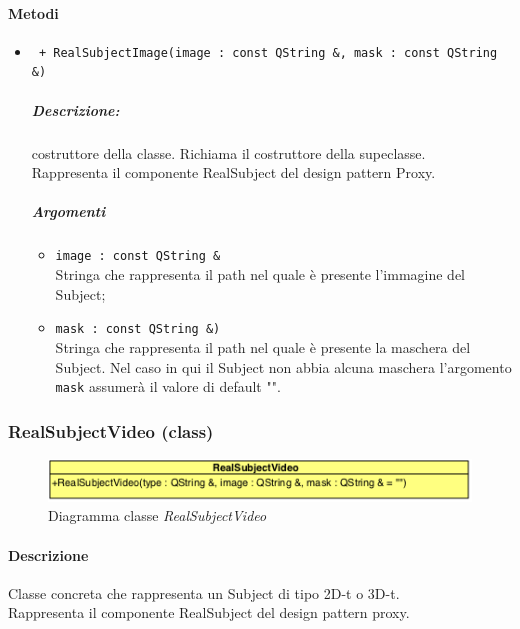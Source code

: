 \paragraph{Metodi \\}
	\begin{itemize}
		\item \color{blue}\verb! + RealSubjectImage(image : const QString &, mask : const QString &)!
		\color{black}
		\subparagraph{Descrizione:} costruttore della classe. Richiama il costruttore della supeclasse.
		\\Rappresenta il componente RealSubject del design pattern\g{} Proxy.
		
		\subparagraph{Argomenti}
			\begin{itemize}
				\item \color{RoyalPurple}\verb!image : const QString &!\\
				\color{black}Stringa che rappresenta il path nel quale è presente l'immagine del Subject\g{};
				
				\item \color{RoyalPurple}\verb!mask : const QString &)!\\
				\color{black}Stringa che rappresenta il path nel quale è presente la maschera del Subject\g{}.
				Nel caso in qui il Subject\g{} non abbia alcuna maschera l'argomento \verb!mask! assumerà il valore di default "".
			\end{itemize}
	\end{itemize}

\pagebreak
\color{black}
\subsubsection{RealSubjectVideo (class)}
\label{RealSubject3D}
\begin{figure}[!h]
\centering
			\includegraphics[scale=1]{./Content/Immagini/modelCore/RealSubjectVideo.png}
			\caption{Diagramma classe \textsl{RealSubjectVideo}}
			\label{realSubject3d_img}
\end{figure}

\paragraph{Descrizione \\}
Classe concreta che rappresenta un Subject\g{} di tipo 2D-t o 3D-t.
\\Rappresenta il componente RealSubject del design pattern\g{} proxy.

